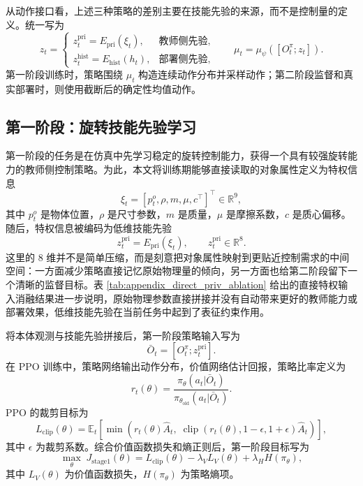 从动作接口看，上述三种策略的差别主要在技能先验的来源，而不是控制量的定义。统一写为
\begin{equation}
z_t =
\begin{cases}
z_t^{\mathrm{pri}}=E_{\mathrm{pri}}(\xi_t), & \text{教师侧先验},\\
z_t^{\mathrm{hist}}=E_{\mathrm{hist}}(h_t), & \text{部署侧先验},
\end{cases}
\qquad
\mu_t=\mu_\psi([O_t^\pi;z_t]).
\end{equation}
第一阶段训练时，策略围绕 \(\mu_t\) 构造连续动作分布并采样动作；第二阶段监督和真实部署时，则使用截断后的确定性均值动作。

\subsection{第一阶段：旋转技能先验学习}
\thesisbodyfont
第一阶段的任务是在仿真中先学习稳定的旋转控制能力，获得一个具有较强旋转能力的教师侧控制策略。为此，本文将训练期能够直接读取的对象属性定义为特权信息
\begin{equation}
\xi_t = [p_t^o,\rho,m,\mu,c^\top]^\top \in \mathbb{R}^{9},
\end{equation}
其中 \(p_t^o\) 是物体位置，\(\rho\) 是尺寸参数，\(m\) 是质量，\(\mu\) 是摩擦系数，\(c\) 是质心偏移。随后，特权信息被编码为低维技能先验
\begin{equation}
z_t^{\mathrm{pri}} = E_{\mathrm{pri}}(\xi_t), \qquad z_t^{\mathrm{pri}} \in \mathbb{R}^{8}.
\end{equation}
这里的 \(8\) 维并不是简单压缩，而是刻意把对象属性映射到更贴近控制需求的中间空间：一方面减少策略直接记忆原始物理量的倾向，另一方面也给第二阶段留下一个清晰的监督目标。表 \ref{tab:appendix_direct_priv_ablation} 给出的直接特权输入消融结果进一步说明，原始物理参数直接拼接并没有自动带来更好的教师能力或部署效果，低维技能先验在当前任务中起到了表征约束作用。

将本体观测与技能先验拼接后，第一阶段策略输入写为
\begin{equation}
\bar O_t = [O_t^\pi;z_t^{\mathrm{pri}}].
\end{equation}
在 PPO 训练中，策略网络输出动作分布，价值网络估计回报，策略比率定义为
\begin{equation}
r_t(\theta)=\frac{\pi_\theta(a_t|\bar O_t)}{\pi_{\theta_{\mathrm{old}}}(a_t|\bar O_t)}.
\label{eq:stage1_prob_ratio}
\end{equation}
PPO 的裁剪目标为
\begin{equation}
L_{\mathrm{clip}}(\theta)=
\mathbb{E}_t\!\left[
\min\!\left(
r_t(\theta)\hat A_t,\;
\operatorname{clip}(r_t(\theta),1-\epsilon,1+\epsilon)\hat A_t
\right)
\right],
\label{eq:stage1_ppo_clip}
\end{equation}
其中 \(\epsilon\) 为裁剪系数。综合价值函数损失和熵正则后，第一阶段目标写为
\begin{equation}
\max_{\theta}\;
J_{\mathrm{stage1}}(\theta)
=
L_{\mathrm{clip}}(\theta)
-\lambda_V L_V(\theta)
+\lambda_H H(\pi_\theta),
\label{eq:stage1_objective}
\end{equation}
其中 \(L_V(\theta)\) 为价值函数损失，\(H(\pi_\theta)\) 为策略熵项。

